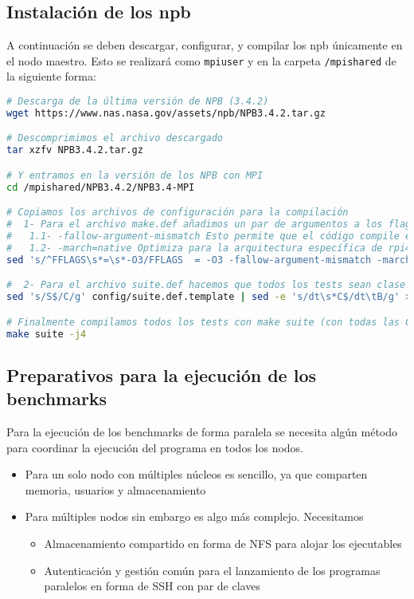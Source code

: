 \subsection{Instalación de los \acrshort{npb}}
A continuación se deben descargar, configurar, y compilar los \acrlong{npb} únicamente en el nodo maestro. Esto se realizará como \texttt{mpiuser} y en la carpeta \texttt{/mpishared} de la siguiente forma:

\begin{lstlisting}[language=bash]
# Descarga de la última versión de NPB (3.4.2)
wget https://www.nas.nasa.gov/assets/npb/NPB3.4.2.tar.gz

# Descomprimimos el archivo descargado
tar xzfv NPB3.4.2.tar.gz

# Y entramos en la versión de los NPB con MPI
cd /mpishared/NPB3.4.2/NPB3.4-MPI

# Copiamos los archivos de configuración para la compilación
#  1- Para el archivo make.def añadimos un par de argumentos a los flags de compilación:
#   1.1- -fallow-argument-mismatch Esto permite que el código compile en las últimas versiones de gfortran
#   1.2- -march=native Optimiza para la arquitectura específica de rpi4
sed 's/^FFLAGS\s*=\s*-O3/FFLAGS  = -O3 -fallow-argument-mismatch -march=native/g' config/make.def.template | sed -e 's/^CFLAGS\s*=\s*-O3/CFLAGS  = -O3 -march=native/g' > config/make.def

#  2- Para el archivo suite.def hacemos que todos los tests sean clase C menos DT, que debe ser B
sed 's/S$/C/g' config/suite.def.template | sed -e 's/dt\s*C$/dt\tB/g' > config/suite.def

# Finalmente compilamos todos los tests con make suite (con todas las CPU en paralelo)
make suite -j4
\end{lstlisting}

\subsection{Preparativos para la ejecución de los benchmarks}
Para la ejecución de los benchmarks de forma paralela se necesita algún método para coordinar la ejecución del programa en todos los nodos.

\begin{itemize}
    \item Para un solo nodo con múltiples núcleos es sencillo, ya que comparten memoria, usuarios y almacenamiento
    \item Para múltiples nodos sin embargo es algo más complejo. Necesitamos
    \begin{itemize}
        \item Almacenamiento compartido en forma de NFS para alojar los ejecutables
        \item Autenticación y gestión común para el lanzamiento de los programas paralelos en forma de SSH con par de claves
    \end{itemize}
\end{itemize}

